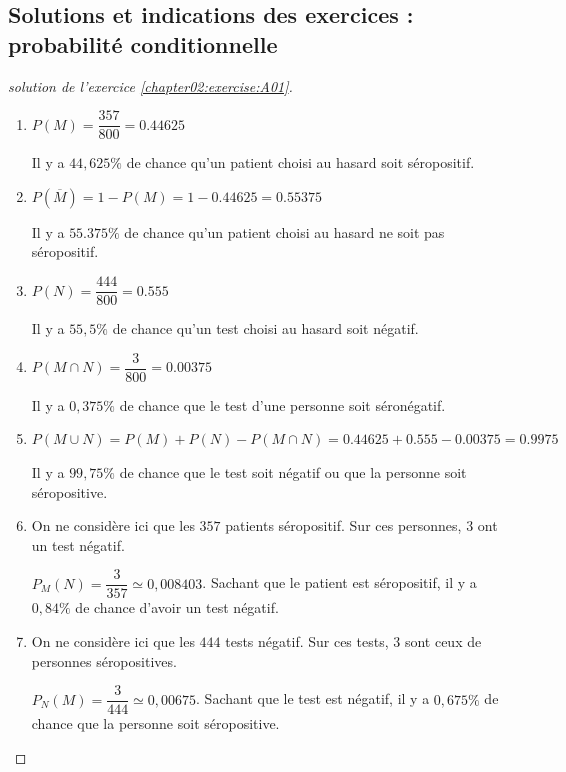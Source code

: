 \documentclass[main.tex]{subfiles}
\begin{document}
\subsection{Solutions et indications des exercices : probabilité conditionnelle}
\begin{proof}[solution de l'exercice \ref{chapter02:exercise:A01}]\hfill 
	\begin{enumerate}[leftmargin=*,label=\arabic*)]
		\item $P(M) = \dfrac{357}{800} = 0.44625$
		
		Il y a $44,625\%$ de chance qu'un patient choisi au hasard soit séropositif.
		\item $P(\overline{M}) = 1-P(M) = 1-0.44625 = 0.55375$
		
		Il y a $55.375\%$ de chance qu'un patient choisi au hasard ne soit pas séropositif.
		\item $P(N) = \dfrac{444}{800} = 0.555$
		
		Il y a $55,5\%$ de chance qu'un test choisi au hasard soit négatif.
		\item $P(M\cap N) = \dfrac{3}{800} = 0.00375$
		
		Il y a $0,375\%$ de chance que le test d'une personne soit séronégatif.
		\item $P(M\cup N) = P(M) + P(N) - P(M\cap N) = 0.44625 + 0.555 - 0.00375 = 0.9975$
		
		Il y a $99,75\%$ de chance que le test soit négatif ou que la personne soit séropositive.
		\item On ne considère ici que les \textcolor{red!80}{$357$} patients séropositif. Sur ces personnes, \textcolor{violet!80}{$3$} ont un test négatif.
		
		$P_M(N) = \dfrac{3}{357} \simeq 0,008403$. Sachant que le patient est séropositif, il y a $0,84\%$ de chance d'avoir un test négatif. 
		\item On ne considère ici que les \textcolor{blue!80}{$444$} tests négatif. Sur ces tests, \textcolor{violet!80}{$3$} sont ceux de personnes séropositives.
		
		$P_N(M) = \dfrac{3}{444} \simeq 0,00675$. Sachant que le test est négatif, il y a $0,675\%$ de chance que la personne soit séropositive.  
	\end{enumerate}
\end{proof}  
\end{document}
